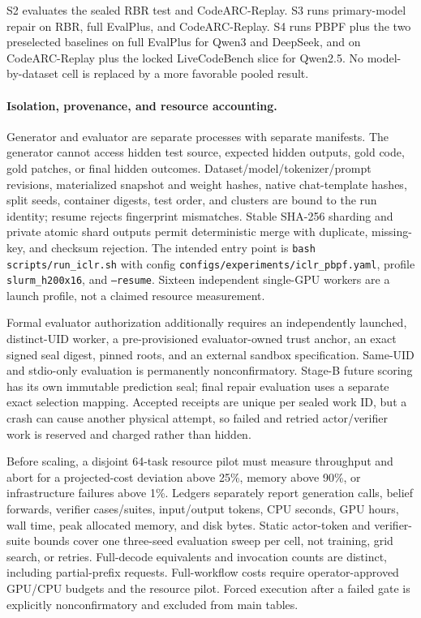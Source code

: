 S2 evaluates the sealed RBR test and CodeARC-Replay. S3 runs primary-model repair
on RBR, full EvalPlus, and CodeARC-Replay. S4 runs PBPF plus the two preselected
baselines on full EvalPlus for Qwen3 and DeepSeek, and on CodeARC-Replay plus
the locked LiveCodeBench slice for Qwen2.5. No model-by-dataset cell is replaced
by a more favorable pooled result.

\paragraph{Isolation, provenance, and resource accounting.}
Generator and evaluator are separate processes with separate manifests. The
generator cannot access hidden test source, expected hidden outputs, gold code,
gold patches, or final hidden outcomes. Dataset/model/tokenizer/prompt revisions,
materialized snapshot and weight hashes, native chat-template hashes, split
seeds, container digests, test order, and clusters are bound to the run identity;
resume rejects fingerprint mismatches. Stable SHA-256 sharding and private
atomic shard outputs permit deterministic merge with duplicate, missing-key,
and checksum rejection. The intended entry point is
\texttt{bash scripts/run\_iclr.sh} with config
\texttt{configs/experiments/iclr\_pbpf.yaml}, profile
\texttt{slurm\_h200x16}, and \texttt{--resume}. Sixteen independent single-GPU
workers are a launch profile, not a claimed resource measurement.

Formal evaluator authorization additionally requires an independently launched,
distinct-UID worker, a pre-provisioned evaluator-owned trust anchor, an exact
signed seal digest, pinned roots, and an external sandbox specification.
Same-UID and stdio-only evaluation is permanently nonconfirmatory. Stage-B
future scoring has its own immutable prediction seal; final repair evaluation
uses a separate exact selection mapping. Accepted receipts are unique per
sealed work ID, but a crash can cause another physical attempt, so failed and
retried actor/verifier work is reserved and charged rather than hidden.

Before scaling, a disjoint 64-task resource pilot must measure throughput and
abort for a projected-cost deviation above 25\%, memory above 90\%, or
infrastructure failures above 1\%. Ledgers separately report generation calls,
belief forwards, verifier cases/suites, input/output tokens, CPU seconds, GPU
hours, wall time, peak allocated memory, and disk bytes. Static actor-token and
verifier-suite bounds cover one three-seed evaluation sweep per cell, not
training, grid search, or retries. Full-decode equivalents and invocation
counts are distinct, including partial-prefix requests. Full-workflow costs
require operator-approved GPU/CPU budgets and the resource pilot.
Forced execution after
a failed gate is explicitly nonconfirmatory and excluded from main tables.
